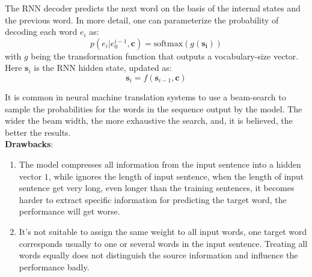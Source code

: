  The RNN decoder predicts the next word on the basis of the internal states and the previous word. In more detail, one can parameterize the probability of decoding each word $e_i$ as:
 \[ p(e_i|e_0^{i-1},  {\bm{c}}) = \text{softmax}(g(\bm{s_i}))\]
 with $g$ being the transformation function that outputs a vocabulary-size vector. Here $\bm{s}_i$ is the RNN hidden state, updated as:
\[ \bm{s}_i = f(\bm{s}_{i-1}, \bm{c})\]

It is common in neural machine translation systems to use a beam-search to sample the probabilities for the words in the sequence output by the model. The wider the beam width, the more exhaustive the search, and, it is believed, the better the results.\\









%
%

\textbf{Drawbacks}:
\begin{enumerate}
	\item The model compresses all information from the input sentence into a hidden vector ${1}$, while ignores the length of input sentence, when the length of input sentence get very long, even longer than the training sentences, it becomes harder to extract specific information for predicting the target word, the performance will get worse.
	\item It's not suitable to assign the same weight to all input words, one target word corresponds usually to one or several words in the input sentence. Treating all words equally does not distinguish the source information and influence the performance badly.

\end{enumerate}

